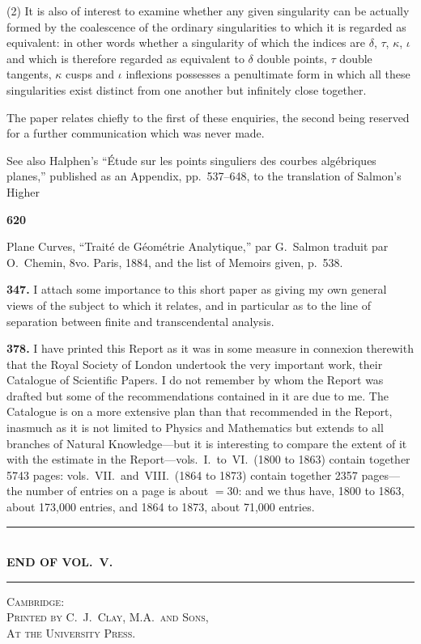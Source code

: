 \documentclass[12pt,a4paper]{article}
\theoremstyle{plain}
\begin{document}
(2) It is also of interest to examine whether any given singularity can be actually formed by the coalescence of the ordinary singularities to which it is regarded as equivalent: in other words whether a singularity of which the indices are $\delta$, $\tau$, $\kappa$, $\iota$ and which is therefore regarded as equivalent to $\delta$ double points, $\tau$ double tangents, $\kappa$ cusps and $\iota$ inflexions possesses a penultimate form in which all these singularities exist distinct from one another but infinitely close together.

The paper relates chiefly to the first of these enquiries, the second being reserved for a further communication which was never made.

See also Halphen's ``\'{E}tude sur les points singuliers des courbes alg\'{e}briques planes,'' published as an Appendix, pp.~537--648, to the translation of Salmon's Higher

\newpage
\noindent\textbf{620}

Plane Curves, ``Trait\'{e} de G\'{e}om\'{e}trie Analytique,'' par G.~Salmon traduit par O.~Chemin, 8vo. Paris, 1884, and the list of Memoirs given, p.~538.

\vspace{0.3cm}
\noindent\textbf{347.} I attach some importance to this short paper as giving my own general views of the subject to which it relates, and in particular as to the line of separation between finite and transcendental analysis.

\vspace{0.3cm}
\noindent\textbf{378.} I have printed this Report as it was in some measure in connexion therewith that the Royal Society of London undertook the very important work, their Catalogue of Scientific Papers. I do not remember by whom the Report was drafted but some of the recommendations contained in it are due to me. The Catalogue is on a more extensive plan than that recommended in the Report, inasmuch as it is not limited to Physics and Mathematics but extends to all branches of Natural Knowledge---but it is interesting to compare the extent of it with the estimate in the Report---vols.~I.~to~VI.~(1800 to 1863) contain together 5743 pages: vols.~VII.~and~VIII.~(1864 to 1873) contain together 2357 pages---the number of entries on a page is about $=30$: and we thus have, 1800 to 1863, about 173,000 entries, and 1864 to 1873, about 71,000 entries.

\vspace{1cm}
\begin{center}
\rule{0.5\textwidth}{0.4pt}\\[6pt]
\textbf{END OF VOL.~V.}\\[6pt]
\rule{0.5\textwidth}{0.4pt}
\end{center}

\vspace{0.5cm}
\begin{center}
\textsc{Cambridge}:\\
\textsc{Printed by C.~J.~Clay, M.A.~and Sons,}\\
\textsc{At the University Press.}
\end{center}
\end{document}
